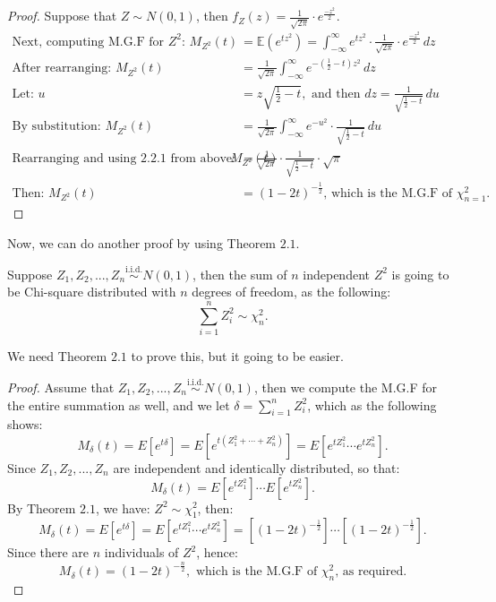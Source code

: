 \begin{proof}
Suppose that \( Z \sim N(0, 1) \), then \( f_{Z}(z) = \frac{1}{\sqrt{2\pi}} \cdot e^{\frac{-z^2}{2}} \).
\begin{align}
\text{Next, computing M.G.F for $Z^2$: }M_{Z^2}(t) &= \mathbb{E}(e^{tz^2}) = \int_{-\infty}^{\infty} e^{tz^2} \cdot \frac{1}{\sqrt{2\pi}} \cdot e^{\frac{-z^2}{2}}\, dz \\
\text{After rearranging: }M_{Z^2}(t) &= \frac{1}{\sqrt{2\pi}} \int_{-\infty}^{\infty} e^{-(\frac{1}{2} - t)z^2} \, dz \\
\text{Let: }u &= z\sqrt{\tfrac{1}{2} - t}, \text{ and then } dz = \frac{1}{\sqrt{\tfrac{1}{2} - t}} \, du \\
\text{By substitution: }M_{Z^2}(t) &= \frac{1}{\sqrt{2\pi}} \int_{-\infty}^{\infty} e^{-u^2} \cdot \frac{1}{\sqrt{\tfrac{1}{2} - t}} \, du \\
\text{Rearranging and using $2.2.1$ from above: }M_{Z^2}(t) &= \frac{1}{\sqrt{2\pi}} \cdot \frac{1}{\sqrt{\tfrac{1}{2} - t}} \cdot \sqrt{\pi} \\
\text{Then: }M_{Z^2}(t) &= (1 - 2t)^{-\frac{1}{2}} \text{, which is the M.G.F of $\chi_{n = 1}^{2}$.}
\end{align}
\end{proof}



\noindent
Now, we can do another proof by using Theorem $2.1$.

\begin{thm}[$ \sum_{i = 1}^{n}Z_{i}^{2} \sim \chi_{n}^{2}$]
Suppose $Z_1, Z_2, ..., Z_n \overset{\text{i.i.d.}}{\sim} N(0,1)$, then the sum of $n$ independent $Z^2$ is going to be Chi-square distributed with $n$ degrees of freedom, as the following: \[ \sum_{i=1}^{n}Z_{i}^{2} \sim \chi_{n}^{2}.\]
\end{thm}

\noindent
We need Theorem $2.1$ to prove this, but it going to be easier. 

\begin{proof}
Assume that $Z_1, Z_2, ..., Z_n \overset{\text{i.i.d.}}{\sim} N(0,1)$, then we compute the M.G.F for the entire summation as well, and we let $\delta = \sum_{i = 1}^{n} Z_{i}^{2}$, which as the following shows:\[ M_{\delta}(t) = E[e^{t\delta}] = E[e^{t(Z_1^2 + \cdots + Z_n^2)}] = E[e^{tZ_1^2} \cdots e^{tZ_n^2}].\]
\hspace*{2.7em} Since $Z_1, Z_2, ..., Z_n$ are independent and identically distributed, so that: \[ M_{\delta}(t) = E[e^{tZ_1^2}] \cdots E[e^{tZ_n^2}].\]
\hspace*{2.7em} By Theorem $2.1$, we have: $Z^2 \sim \chi_{1}^{2}$, then: \[ M_{\delta}(t) = E[e^{t\delta}] = E[e^{tZ_1^2} \cdots e^{tZ_n^2}] = [(1-2t)^{-\frac{1}{2}}] \cdots [(1-2t)^{-\frac{1}{2}}].\]
\hspace*{2.7em} Since there are $n$ individuals of $Z^2$, hence: \[ M_{\delta}(t) = (1-2t)^{-\frac{n}{2}}, \text{ which is the M.G.F of $\chi_{n}^{2}$, as required}.\]
\end{proof}

